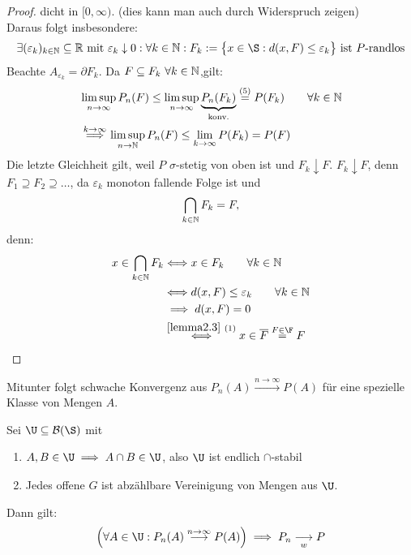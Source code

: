 \begin{proof}
dicht in $[0,\infty)$. (dies kann man auch durch Widerspruch zeigen)\\
Daraus folgt insbesondere:
\begin{align*}
\exists(\varepsilon_k)_{k\in\N}\subseteq\R\mit\varepsilon_k\downarrow0:\forall	 k\in\N: F_k:=\big\lbrace x\in\S:d(x,F)\leq\varepsilon_k\big\rbrace\text{ ist $P$-randlos}
\end{align*}
Beachte $A_{\varepsilon_k}=\partial F_k$. Da $F\subseteq F_k~\forall k\in\mathbb{N}$,gilt:
\begin{align*}
&\limsup\limits_{n\to\infty} P_n(F)
\leq\limsup\limits_{n\to\infty} \underbrace{P_n(F_k)}_{\text{konv.}}
\stackrel{(5)}{=}
P(F_k)\qquad\forall k\in\mathbb{N}\\
&\stackrel{k\to\infty}{\implies}
\limsup\limits_{n\to\mathbb{N}} P_n(F)
\leq\lim\limits_{k\to\infty} P(F_k)
=P(F)
\end{align*}
Die letzte Gleichheit gilt, weil $P$ $\sigma$-stetig von oben ist und $F_k\downarrow F$. $F_k\downarrow F$, denn $F_1\supseteq F_2\supseteq\ldots$, da $\varepsilon_k$ monoton fallende Folge ist und
\begin{align*}
\bigcap\limits_{k\in\mathbb{N}}F_k=F, 
\end{align*}
denn: 
\begin{align*}
x\in\bigcap\limits_{k\in\N}F_k
&\Longleftrightarrow
x\in F_k\qquad\forall k\in\N\\
&\Longleftrightarrow
d(x,F)\leq\varepsilon_k\qquad\forall k\in\N\\
&\implies
d(x,F)=0\\
&\stackrel{\ref{lemma2.3}~(1)}{\Longleftrightarrow}
x\in \overline{F}\stackeq{F\in\F}F
\end{align*}
\end{proof}

Mitunter folgt schwache Konvergenz aus $P_n(A)\stackrel{n\to\infty}{\longrightarrow} P(A)$ für eine spezielle Klasse von Mengen $A$.

\begin{theorem}\label{theorem4.3}
Sei $\U\subseteq\B(\S)$ mit
\begin{enumerate}[label=(\roman*)]
\item $\begin{aligned}
A,B\in \U\implies A\cap B\in\U
\end{aligned}$, also $\U$ ist endlich $\cap$-stabil
\item Jedes offene $G$ ist abzählbare Vereinigung von Mengen aus $\U$.
\end{enumerate}
Dann gilt:
\begin{align*}
\Big(\forall A\in\U:P_n(A)\stackrel{n\to\infty}{\longrightarrow} P(A)\Big)\implies P_n\stackrelnew{w}{}{\longrightarrow} P
\end{align*}
\end{theorem}

